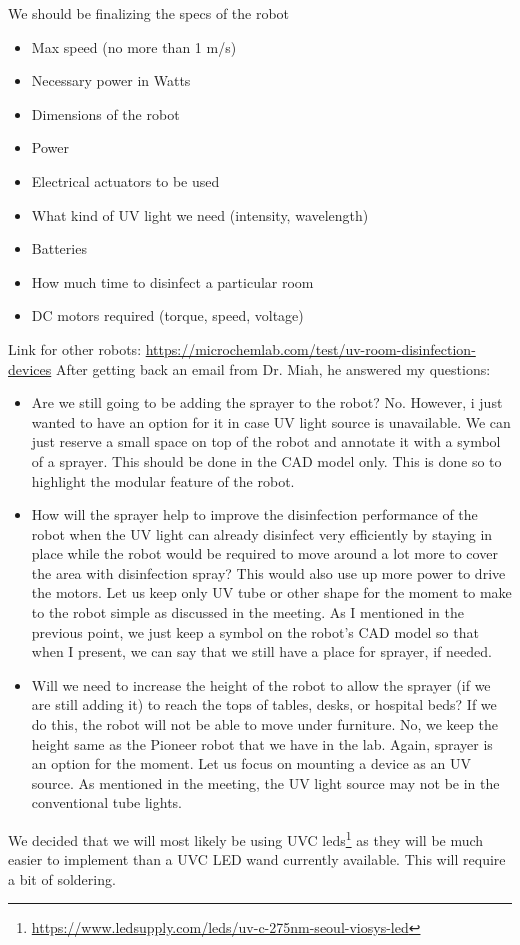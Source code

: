 \documentclass[fontsize=11pt, %
                             paper=a4, %
                             twoside, %
                             captions=tableheading,
                             index=totoc,
                             hyperref]{labbook}
\begin{document}
\begin{addmargin}[0cm]{0cm}
We should be finalizing the specs of the robot
\begin{itemize}
\item Max speed (no more than 1 m/s)
\item Necessary power in Watts
\item Dimensions of the robot
\item Power
\item Electrical actuators to be used
\item What kind of UV light we need (intensity, wavelength)
\item Batteries
\item How much time to disinfect a particular room
\item DC motors required (torque, speed, voltage)
\end{itemize}
Link for other robots:
\url{https://microchemlab.com/test/uv-room-disinfection-devices}
After getting back an email from Dr. Miah, he answered my questions:
\begin{itemize}
\item Are we still going to be adding the sprayer to the robot?\smallbreak\noindent
No. However, i just wanted to have an option for it in case UV light source is unavailable. We can just reserve a small space on top of the robot and annotate it with a symbol of a sprayer. This should be done in the CAD model only.   This is done so to highlight the modular feature of the robot.
\item How will the sprayer help to improve the disinfection performance of the robot when the UV light can already disinfect very efficiently by staying in place while the robot would be required to move around a lot more to cover the area with disinfection spray? This would also use up more power to drive the motors.\smallbreak\noindent 
Let us keep only UV tube or other shape for the moment to make to the robot simple as discussed in the meeting. As I mentioned in the previous point, we just keep a symbol on the robot's CAD model so that when I present, we can say that we still have a place for sprayer, if needed.
\item Will we need to increase the height of the robot to allow the sprayer (if we are still adding it) to reach the tops of tables, desks, or hospital beds? If we do this, the robot will not be able to move under furniture.\smallbreak\noindent
No, we keep the height same as the Pioneer robot that we have in the lab. Again, sprayer is an option for the moment. Let us focus on mounting a device as an UV source. As mentioned in the meeting, the UV light source may not be in the conventional tube lights.
\end{itemize}
We decided that we will most likely be using UVC leds\footnote{\url{https://www.ledsupply.com/leds/uv-c-275nm-seoul-viosys-led}} as they will be much easier to implement than a UVC LED wand currently available. This will require a bit of soldering.
\end{addmargin} 
\end{document}
